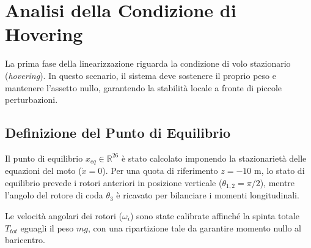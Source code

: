 \clearpage

\section{Analisi della Condizione di Hovering}
La prima fase della linearizzazione riguarda la condizione di volo stazionario (\textit{hovering}). In questo scenario, il sistema deve sostenere il proprio peso e mantenere l'assetto nullo, garantendo la stabilità locale a fronte di piccole perturbazioni.

\subsection{Definizione del Punto di Equilibrio}
Il punto di equilibrio $x_{eq} \in \mathbb{R}^{26}$ è stato calcolato imponendo la stazionarietà delle equazioni del moto ($\dot{x} = 0$). Per una quota di riferimento $z = -10$ m, lo stato di equilibrio prevede i rotori anteriori in posizione verticale ($\theta_{1,2} = \pi/2$), mentre l'angolo del rotore di coda $\theta_3$ è ricavato per bilanciare i momenti longitudinali.

Le velocità angolari dei rotori ($\omega_i$) sono state calibrate affinché la spinta totale $T_{tot}$ eguagli il peso $mg$, con una ripartizione tale da garantire momento nullo al baricentro.

